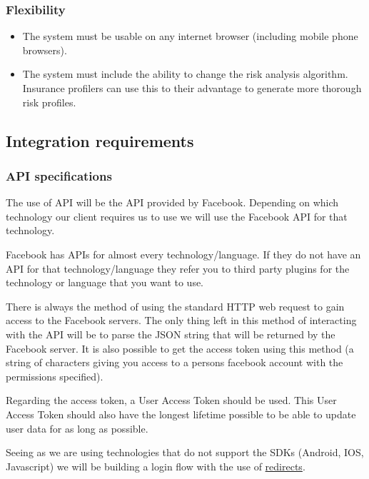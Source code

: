 \documentclass{article}
\begin{document}
		\subsubsection{Flexibility}
		\begin{itemize}
			\item The system must be usable on any internet browser (including mobile phone browsers). 
			\item The system must include the ability to change the risk analysis algorithm. Insurance profilers can use this to their advantage to generate more thorough risk profiles. 
		\end{itemize}
		
		 

	\subsection{Integration requirements}
		\subsubsection{API specifications}
			The use of API will be the API provided by Facebook. Depending on which technology our client requires us to use we will use the Facebook API for that technology.

			Facebook has APIs for almost every technology/language. If they do not have an API for that technology/language they refer you to third party plugins for the technology or language that you want to use.

			There is always the method of using the standard HTTP web request to gain access to the Facebook servers. The only thing left in this method of interacting with the API will be to parse the JSON string that will be returned by the Facebook server. It is also possible to get the access token using this method (a string of characters giving you access to a persons facebook account with the permissions specified).

			Regarding the access token, a User Access Token should be used. This User Access Token should also have the longest lifetime possible to be able to update user data for as long as possible.

			Seeing as we are using technologies that do not support the SDKs (Android, IOS, Javascript) we will be building a login flow with the use of \href{https://developers.facebook.com/docs/facebook-login/manually-build-a-login-flow}{redirects}.\\
\end{document}
